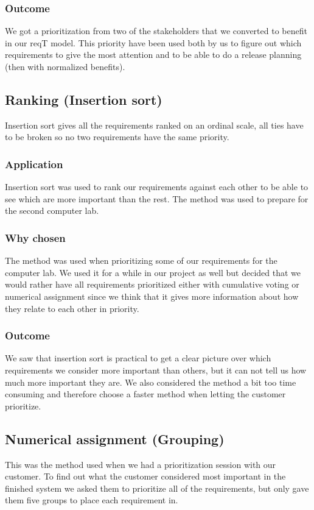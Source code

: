 \documentclass[a4paper]{article}
\begin{document}
		\subsubsection{Outcome}
			We got a prioritization from two of the stakeholders that we converted to benefit in our reqT model. This priority have been used both by us to figure out which requirements to give the most attention and to be able to do a release planning (then with normalized benefits).

	\subsection{Ranking (Insertion sort)}
		Insertion sort gives all the requirements ranked on an ordinal scale, all ties have to be broken so no two requirements have the same priority.
		\subsubsection{Application}
			Insertion sort was used to rank our requirements against each other to be able to see which are more important than the rest. The method was used to prepare for the second computer lab.
		\subsubsection{Why chosen}
			The method was used when prioritizing some of our requirements for the computer lab. We used it for a while in our project as well but decided that we would rather have all requirements prioritized either with cumulative voting or numerical assignment since we think that it gives more information about how they relate to each other in priority.
		\subsubsection{Outcome}
			We saw that insertion sort is practical to get a clear picture over which requirements we consider more important than others, but it can not tell us how much more important they are. We also considered the method a bit too time consuming and therefore choose a faster method when letting the customer prioritize.  			
		
	\subsection{Numerical assignment (Grouping)}
		This was the method used when we had a prioritization session with our customer.
		To find out what the customer considered most important in the finished system we asked them to prioritize all of the requirements, but only gave them five groups to place each requirement in.
\end{document}
